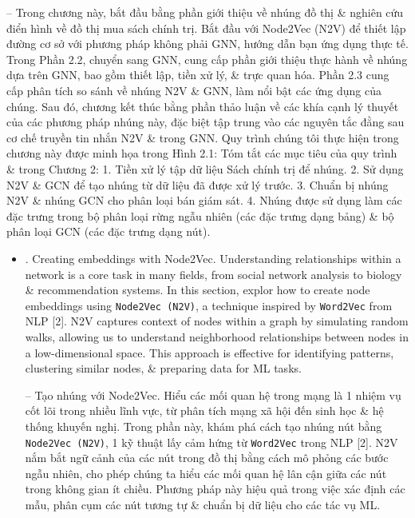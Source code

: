 \documentclass{article}
\begin{document}
\begin{itemize}
    -- Trong chương này, bắt đầu bằng phần giới thiệu về nhúng đồ thị \& nghiên cứu điển hình về đồ thị mua sách chính trị. Bắt đầu với Node2Vec (N2V) để thiết lập đường cơ sở với phương pháp không phải GNN, hướng dẫn bạn ứng dụng thực tế. Trong Phần 2.2, chuyển sang GNN, cung cấp phần giới thiệu thực hành về nhúng dựa trên GNN, bao gồm thiết lập, tiền xử lý, \& trực quan hóa. Phần 2.3 cung cấp phân tích so sánh về nhúng N2V \& GNN, làm nổi bật các ứng dụng của chúng. Sau đó, chương kết thúc bằng phần thảo luận về các khía cạnh lý thuyết của các phương pháp nhúng này, đặc biệt tập trung vào các nguyên tắc đằng sau cơ chế truyền tin nhắn N2V \& trong GNN. Quy trình chúng tôi thực hiện trong chương này được minh họa trong {\sf Hình 2.1: Tóm tắt các mục tiêu của quy trình \& trong Chương 2: 1. Tiền xử lý tập dữ liệu Sách chính trị để nhúng. 2. Sử dụng N2V \& GCN để tạo nhúng từ dữ liệu đã được xử lý trước. 3. Chuẩn bị nhúng N2V \& nhúng GCN cho phân loại bán giám sát. 4. Nhúng được sử dụng làm các đặc trưng trong bộ phân loại rừng ngẫu nhiên (các đặc trưng dạng bảng) \& bộ phân loại GCN (các đặc trưng dạng nút).}
    \begin{itemize}
        \item {. Creating embeddings with Node2Vec.} Understanding relationships within a network is a core task in many fields, from social network analysis to biology \& recommendation systems. In this section, explor how to create node embeddings using {\tt Node2Vec (N2V)}, a technique inspired by {\tt Word2Vec} from NLP [2]. N2V captures context of nodes within a graph by simulating random walks, allowing us to understand neighborhood relationships between nodes in a low-dimensional space. This approach is effective for identifying patterns, clustering similar nodes, \& preparing data for ML tasks.

        -- {\sf Tạo nhúng với Node2Vec.} Hiểu các mối quan hệ trong mạng là 1 nhiệm vụ cốt lõi trong nhiều lĩnh vực, từ phân tích mạng xã hội đến sinh học \& hệ thống khuyến nghị. Trong phần này, khám phá cách tạo nhúng nút bằng {\tt Node2Vec (N2V)}, 1 kỹ thuật lấy cảm hứng từ {\tt Word2Vec} trong NLP [2]. N2V nắm bắt ngữ cảnh của các nút trong đồ thị bằng cách mô phỏng các bước ngẫu nhiên, cho phép chúng ta hiểu các mối quan hệ lân cận giữa các nút trong không gian ít chiều. Phương pháp này hiệu quả trong việc xác định các mẫu, phân cụm các nút tương tự \& chuẩn bị dữ liệu cho các tác vụ ML.


\end{itemize}
\end{itemize}
\end{document}
